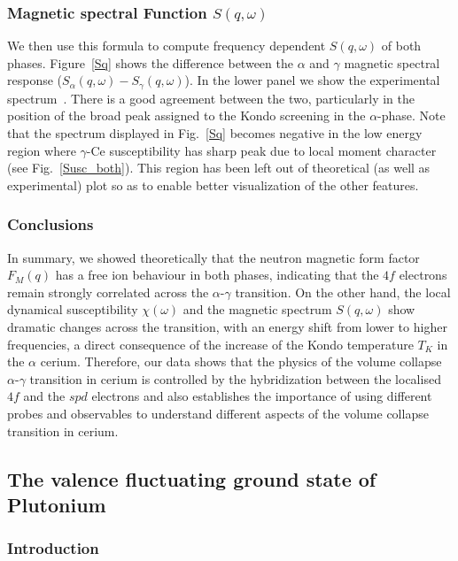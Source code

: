 \documentclass[10pt]{ruthesis}
\begin{document}
{\subsubsection{Magnetic  spectral Function $S(q,\omega)$}
  We then use this formula to
compute frequency dependent $S(q,\omega)$ of both phases.
Figure~\ref{Sq} shows the difference between the $\alpha$ and $\gamma$
magnetic spectral response ($S_\alpha(q,\omega)-S_\gamma(q,\omega)$).
In the lower panel we show the
experimental spectrum~\cite{murani}. There is a good agreement between
the two, particularly in the position of the broad peak assigned to
the Kondo screening in the $\alpha$-phase.  Note that the spectrum
displayed in Fig.~\ref{Sq} becomes negative in the low energy region
where $\gamma$-Ce susceptibility has sharp peak due to local moment character
(see Fig.~\ref{Susc_both}).  This region has been left out of
theoretical (as well as experimental) plot so as to enable better
visualization of the other features.

\subsubsection{Conclusions} 
In summary, we showed theoretically that the neutron magnetic form
factor $F_M(q)$ has a free ion behaviour in both phases, indicating
that the $4f$ electrons remain strongly correlated across the
$\alpha$-$\gamma$ transition.  On the other hand, the local dynamical
susceptibility $\chi(\omega)$ and the magnetic spectrum $S(q,\omega)$
show dramatic changes across the transition, with an energy shift from
lower to higher frequencies, a direct consequence of the increase of
the Kondo temperature $T_K$ in the $\alpha$ cerium.  Therefore, our
data shows that the physics of the volume collapse $\alpha$-$\gamma$
transition in cerium is controlled by the hybridization between the
localised $4f$ and the $spd$ electrons and also establishes the
importance of using different probes and observables to understand
different aspects of the volume collapse transition in cerium.

\subsection{The valence fluctuating ground state of Plutonium}

\subsubsection{Introduction}

}
\end{document}
